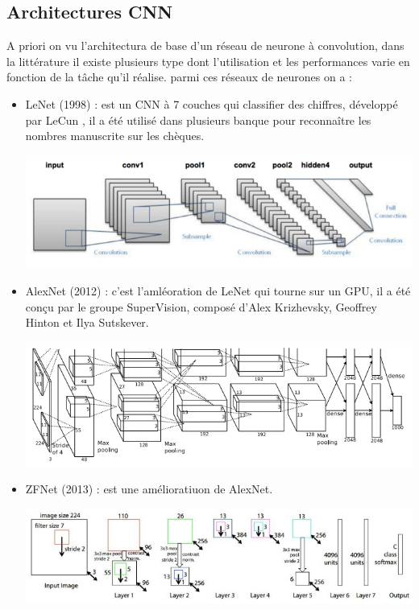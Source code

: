 \subsection{Architectures CNN}
A priori on vu l’architectura de base d'un réseau de neurone à convolution, dans la littérature il existe plusieurs type dont l'utilisation et les performances varie en fonction de la tâche qu'il réalise.
parmi ces réseaux de neurones on a :
\begin{itemize}
	\item LeNet (1998) : est un CNN à 7 couches qui classifier des chiffres, développé par LeCun \cite{lecun1998gradient}, il a été utilisé dans plusieurs banque pour reconnaître les nombres manuscrite sur les chèques.
	\begin{center}
		\includegraphics[scale=0.4]{img27.png}
	\end{center}
	\item AlexNet (2012) : c'est l'amléoration de LeNet qui tourne sur un GPU, il a été conçu par le groupe SuperVision, composé d’Alex Krizhevsky, Geoffrey Hinton et Ilya Sutskever.
	\begin{center}
		\includegraphics[scale=0.4]{img28.png}
	\end{center}
	\item ZFNet (2013) : est une amélioratiuon de AlexNet.
		\begin{center}
		\includegraphics[scale=0.4]{img29.png}

\end{center}
\end{itemize}
